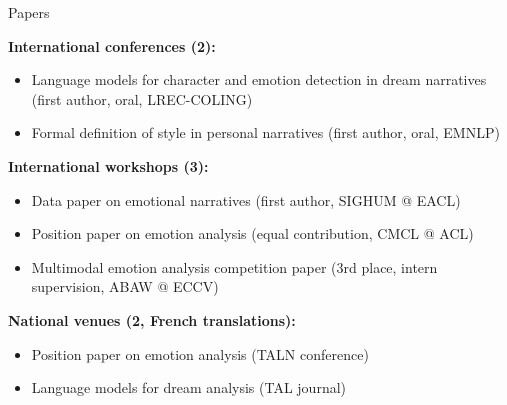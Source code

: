 \documentclass[handout,10pt]{beamer}
\newcommand{\parensmall}[1]{{\scriptsize #1}}
\begin{document}
\begin{frame}{Papers}

\textbf{International conferences (2):}
\begin{itemize}[<+->]
  \setlength{\itemsep}{0.5em}
  \item Language models for character and emotion detection in dream narratives \parensmall{(first author, oral, LREC-COLING)}
  \item Formal definition of style in personal narratives \parensmall{(first author, oral, EMNLP)}
\end{itemize}

\vspace{0.25cm}
\pause

\textbf{International workshops (3):}
\begin{itemize}[<+->]
  \setlength{\itemsep}{0.5em}
  \item Data paper on emotional narratives \parensmall{(first author, SIGHUM @ EACL)}
  \item Position paper on emotion analysis \parensmall{(equal contribution, CMCL @ ACL)}
  \item Multimodal emotion analysis competition paper \parensmall{(3rd place, intern supervision, ABAW @ ECCV)}
\end{itemize}

\vspace{0.25cm}
\pause

\textbf{National venues (2, French translations):} 
\begin{itemize}[<+->]
  \setlength{\itemsep}{0.25em}
  \item Position paper on emotion analysis \parensmall{(TALN conference)}
  \item Language models for dream analysis \parensmall{(TAL journal)}
\end{itemize}
  
\end{frame}
\end{document}

